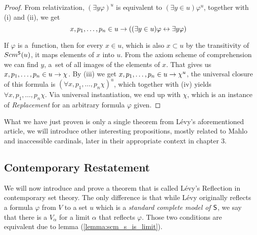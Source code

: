 \begin{proof}
From relativization, $(\exists y \varphi)^{u}$ is equivalent to $(\exists y \in u) \varphi^{u}$, together with (i) and (ii), we get
\begin{equation}
x, p_1, \ldots, p_n \in u \rightarrow ((\exists y \in u) \varphi \leftrightarrow \exists y \varphi)
\end{equation}

If $\varphi$ is a~function, then for every $x \in u$, which is also $x \subset u$ by the transitivity of $Scm^{\sf{S}}(u)$,
it maps elements of $x$ into $u$. From the axiom scheme of comprehension%
we can find $y$, a~set of all images of the elements of $x$.
That gives us $x, p_1, \ldots, p_n \in u \rightarrow \chi$. By (iii) we get $x, p_1, \ldots, p_n \in u \rightarrow \chi^{u}$, the universal closure of this formula is $(\forall x, p_1, \ldots, p_n \chi)^{u}$, 
which together with (iv) yields $\forall x, p_1, \ldots, p_n \chi$. Via universal instantiation, we end up with $\chi$, which is an instance of \emph{Replacement} for an arbitrary formula $\varphi$ given.
\end{proof}

What we have just proven is only a single theorem from Lévy's aforementioned article, we will introduce other interesting propositions, mostly related to Mahlo and inaccessible cardinals, later in their appropriate context in chapter 3. %


\subsection{Contemporary Restatement}
We will now introduce and prove a theorem that is called Lévy's Reflection in contemporary set theory. The only difference is that while Lévy originally reflects a formula $\varphi$ from $V$ to a set $u$ which is a \emph{standard complete model of $\sf{S}$}, we say that there is a $V_\alpha$ for a limit $\alpha$ that reflects $\varphi$. Those two conditions are equivalent due to lemma (\ref{lemma:scm_s_is_limit}).



